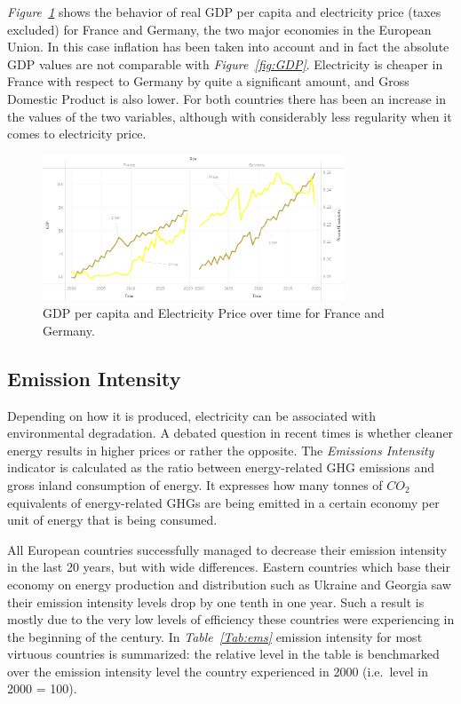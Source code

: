 \documentclass[a4paper,12pt]{book}
\begin{document}
\textit{Figure~\ref{fig:pri-gdp}} shows the behavior of real GDP per capita and electricity price (taxes excluded) for France and Germany, the two major economies in the European Union.  In this case inflation has been taken into account and in fact the absolute GDP values are not comparable with \textit{Figure~\ref{fig:GDP}}. Electricity is cheaper in France with respect to Germany by quite a significant amount, and Gross Domestic Product is also lower. For both countries there has been an increase in the values of the two variables, although with considerably less regularity when it comes to electricity price.

\begin{figure}[tb]
\begin{center}
\captionsetup{justification=centering}
\includegraphics[width=0.8\textwidth]{Images/pri-gdp.png}
\caption{GDP per capita and Electricity Price over time for France and Germany.}
\label{fig:pri-gdp}
\end{center}
\end{figure}

\subsection*{Emission Intensity}

Depending on how it is produced, electricity can be associated with environmental degradation. A debated question in recent times is whether cleaner energy results in higher prices or rather the opposite. The \textit{Emissions Intensity} indicator is calculated as the ratio between energy-related GHG emissions and gross inland consumption of energy. It expresses how many tonnes of $CO_2$ equivalents of energy-related GHGs are being emitted in a certain economy per unit of energy that is being consumed.

All European countries successfully managed to decrease their emission intensity in the last 20 years, but with wide differences. Eastern countries which base their economy on energy production and distribution such as Ukraine and Georgia saw their emission intensity levels drop by one tenth in one year. Such a result is mostly due to the very low levels of efficiency these countries were experiencing in the beginning of the century. In \textit{Table~\ref{Tab:ems}} emission intensity for most virtuous countries is summarized: the relative level in the table is benchmarked over the emission intensity level the country experienced in 2000 (i.e.\ level in 2000 = 100).
\end{document}
